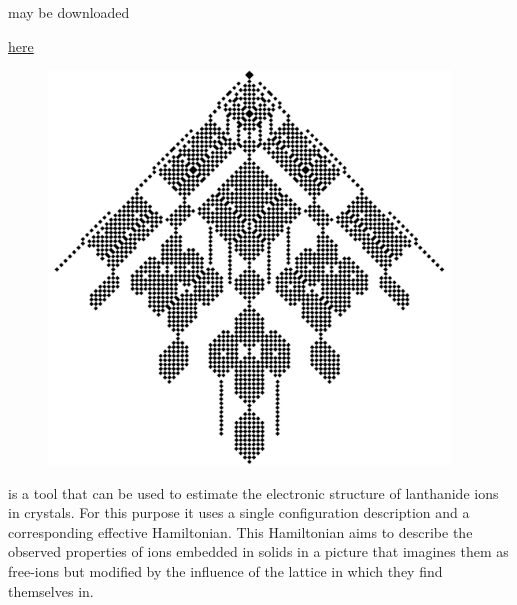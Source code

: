 \documentclass{article}
\begin{document}
\begin{center}
\qlanth may be downloaded

\href{https://github.com/zia-lab/qlanth}{here}
\vspace{-0.27cm}
\begin{figure}[h!]
	\begin{center}
		\includegraphics[width=0.95\textwidth]{pr_code.png}
	\end{center}
\end{figure}

\end{center}

\vspace*{\fill}

\cleardoublepage

\hypertarget{toc}{}

\vspace*{\fill}

\tableofcontents

\vspace*{\fill}

\newpage

\vspace*{\fill}

\qlanth is a tool that can be used to estimate the electronic structure of lanthanide ions in crystals. For this purpose it uses a single configuration description and a corresponding effective Hamiltonian. This Hamiltonian aims to describe the observed properties of ions embedded in solids in a picture that imagines them as free-ions but modified by the influence of the lattice in which they find themselves in.
\end{document}
